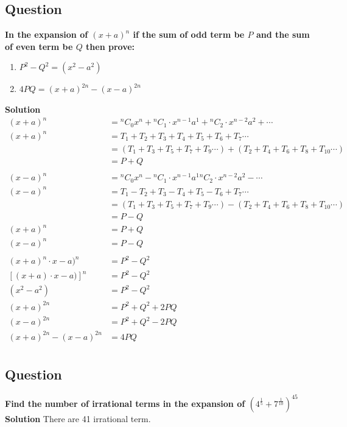 \documentclass[12pt]{article}
\begin{document}
\subsection*{Question }
\textbf{In the expansion of $(x+a)^n$ if the sum of odd term be $P$ and the sum of even term be $Q$ then prove:}
\begin{enumerate}[label=\Roman*.]
    \item $P^2-Q^2 = (x^2-a^2)$
    \item $4PQ = (x+a)^{2n}-(x-a)^{2n}$
\end{enumerate}
\textbf{Solution}\\
\[
\begin{aligned}
    (x+a)^n & = {}^{n}C_{0}x^n+{}^{n}C_{1}\cdot x^{n-1}a^1+{}^{n}C_{2}\cdot x^{n-2}a^2+\cdots \\
    (x+a)^n &= T_1+T_2+T_3+T_4+T_5+T_6+T_7\cdots \\
    & = (T_1+T_3+T_5+T_7+T_9\cdots)+(T_2+T_4+T_6+T_8+T_{10}\cdots)\\
    & = P+Q \\ \\
    (x-a)^n & = {}^{n}C_{0}x^n-{}^{n}C_{1}\cdot x^{n-1}a^1{}^{n}C_{2}\cdot x^{n-2}a^2-\cdots \\
    (x-a)^n &= T_1-T_2+T_3-T_4+T_5-T_6+T_7\cdots \\
    & = (T_1+T_3+T_5+T_7+T_9\cdots)-(T_2+T_4+T_6+T_8+T_{10}\cdots)\\
    & = P-Q \\
    (x+a)^n &= P+Q \\
    (x-a)^n &= P-Q \\ \\
    (x+a)^n \cdot x-a)^n &= P^2 - Q^2 \\
    \left[(x+a) \cdot x-a)\right]^n &= P^2-Q^2 \\
    (x^2-a^2) &= P^2-Q^2 \\
    (x+a)^{2n} &= P^2+Q^2+2PQ \\
    (x-a)^{2n} &= P^2+Q^2-2PQ \\
    (x+a)^{2n}-(x-a)^{2n} &= 4PQ \\
\end{aligned}
\]
\newpage
\subsection*{Question}
\textbf{Find the number of irrational terms in the expansion of $(4^{\frac{1}{5}}+7^{\frac{1}{10}})^{45}$}\\
\textbf{Solution}
There are 41 irrational term.
\end{document}
